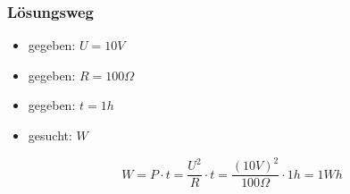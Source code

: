 \begin{frame}
\frametitle{Lösungsweg}
\begin{itemize}
  \item gegeben: $U = 10V$
  \item gegeben: $R = 100\Omega$
  \item gegeben: $t = 1h$
  \item gesucht: $W$
  \end{itemize}
    \pause
    \begin{equation} \nonumber W = P\cdot t = \frac{U^2}{R} \cdot t = \frac{(10V)^2}{100\Omega}\cdot 1h = 1Wh \end{equation}



\end{frame}%
